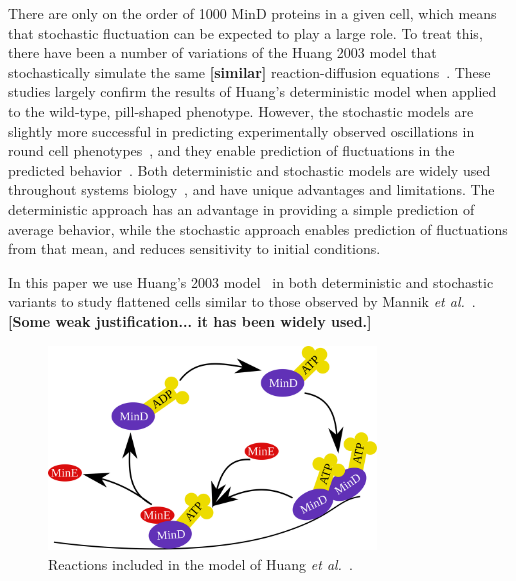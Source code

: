 \documentclass[10pt,letterpaper]{article}
\newcommand{\red}[1]{{\bf \color{red} #1}}
\newcommand{\fixme}[1]{\red{[#1]}}
\begin{document}

There are only on the order of 1000 MinD proteins in a given cell,
which means that stochastic fluctuation can be expected to play a
large role.  To treat this, there have been a number of variations of
the Huang 2003 model that stochastically simulate the same \fixme{similar}
reaction-diffusion equations~\cite{fange2006noise, kerr2006division}.
These studies largely confirm the results of Huang's deterministic
model when applied to the wild-type, pill-shaped phenotype.  However,
the stochastic models are slightly more successful in predicting
experimentally observed oscillations in round cell
phenotypes~\cite{fange2006noise, huang2004min}, and they enable
prediction of fluctuations in the predicted
behavior~\cite{kruse2007experimentalist}.  Both deterministic and
stochastic models are widely used throughout systems
biology~\cite{lawson2013spatial, robb2014stochastic,
  oguz2014stochastic, fu2013deterministic, rudiger2014stochastic}, and
have unique advantages and limitations.  The deterministic approach
has an advantage in providing a simple prediction of average behavior,
while the stochastic approach enables prediction of fluctuations from
that mean, and reduces sensitivity to initial conditions.

In this paper we use Huang's 2003 model~\cite{huang2003dynamic} in
both deterministic and stochastic variants to study flattened cells
similar to those observed by Mannik \emph{et
  al.}~\cite{mannik2009bacterial}.  \fixme{Some weak
  justification... it has been widely used.}

\begin{figure}
  \includegraphics[width=8.7cm]{reactions}
  \caption{Reactions included in the model of Huang \emph{et
      al.}~\cite{huang2003dynamic}.}\label{fig:reactions}
\end{figure}
\end{document}
